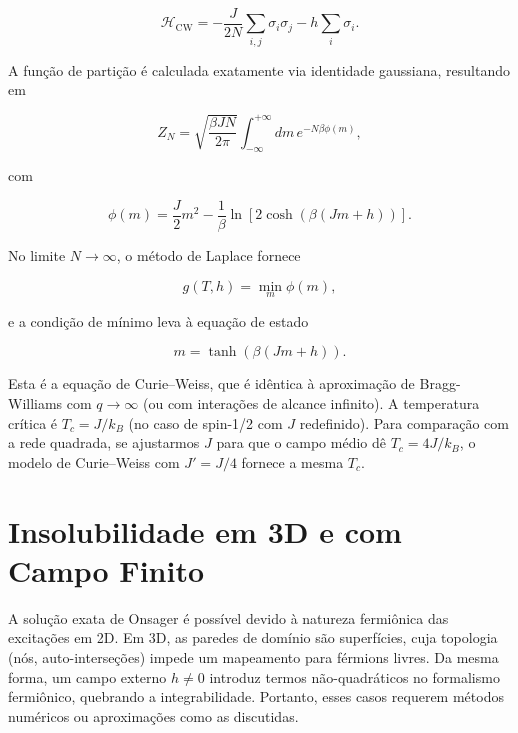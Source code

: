 \documentclass[12pt]{article}
\begin{document}
\begin{equation}
    \mathcal{H}_{\text{CW}} = -\frac{J}{2N} \sum_{i,j} \sigma_i \sigma_j - h \sum_i \sigma_i.
\end{equation}

A função de partição é calculada exatamente via identidade gaussiana, resultando em

\begin{equation}
    Z_N = \sqrt{\frac{\beta J N}{2\pi}} \int_{-\infty}^{+\infty} dm \, e^{-N \beta \phi(m)},
\end{equation}

com

\begin{equation}
    \phi(m) = \frac{J}{2} m^2 - \frac{1}{\beta} \ln\left[ 2 \cosh\left( \beta (J m + h) \right) \right].
\end{equation}

No limite \(N \to \infty\), o método de Laplace fornece

\begin{equation}
    g(T,h) = \min_m \phi(m),
\end{equation}

e a condição de mínimo leva à equação de estado

\begin{equation}
    m = \tanh\left( \beta (J m + h) \right).
\end{equation}

Esta é a equação de Curie–Weiss, que é idêntica à aproximação de Bragg-Williams com \(q \to \infty\) (ou com interações de alcance infinito). A temperatura crítica é \(T_c = J/k_B\) (no caso de spin-1/2 com \(J\) redefinido). Para comparação com a rede quadrada, se ajustarmos \(J\) para que o campo médio dê \(T_c = 4J/k_B\), o modelo de Curie–Weiss com \(J' = J/4\) fornece a mesma \(T_c\).

\section{Insolubilidade em 3D e com Campo Finito}

A solução exata de Onsager é possível devido à natureza fermiônica das excitações em 2D. Em 3D, as paredes de domínio são superfícies, cuja topologia (nós, auto-interseções) impede um mapeamento para férmions livres. Da mesma forma, um campo externo \(h \neq 0\) introduz termos não-quadráticos no formalismo fermiônico, quebrando a integrabilidade. Portanto, esses casos requerem métodos numéricos ou aproximações como as discutidas.
\end{document}
